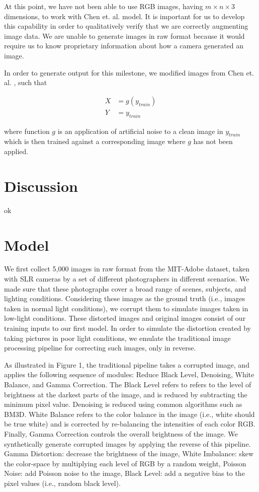 \documentclass{article}
\begin{document}
At this point, we have not been able to use RGB images, having
$m \times n \times 3$ dimensions, to work with Chen et. al.
\cite{chen2018learning} model. It is important for us to develop this
capability in order to qualitatively verify that we are correctly augmenting
image data. We are unable to generate images in raw format because
it would require us to know proprietary information about how a camera
generated an image.

In order to generate output for this milestone, we modified images from
Chen et. al. \cite{chen2018learning}, such that

\begin{align*}
  X &= g(y_{train})\\
  Y &= y_{train}
\end{align*}

where function $g$ is an application of artificial noise to a clean
image in $y_{train}$ which is then trained against a corresponding
image where $g$ has not been applied.


\section{Discussion}

ok


\section{Model}

We first collect 5,000 images in raw format from the MIT-Adobe dataset, taken with SLR cameras by a set of different photographers in different scenarios. We made sure that these photographs cover a broad range of scenes, subjects, and lighting conditions. Considering these images as the ground truth (i.e., images taken in normal light conditions), we corrupt them to simulate images taken in low-light conditions. These distorted images and original images consist of our training inputs to our first model. 
In order to simulate the distortion created by taking pictures in poor light conditions, we emulate the traditional image processing pipeline for correcting such images, only in reverse. 

As illustrated in Figure 1, the traditional pipeline takes a corrupted image, and applies the following sequence of modules: Reduce Black Level, Denoising, White Balance, and Gamma Correction. The Black Level refers to refers to the level of brightness at the darkest parts of the image, and is reduced by subtracting the minimum pixel value. Denoising is reduced using common algorithms such as BM3D. White Balance refers to the color balance in the image (i.e., white should be true white) and is corrected by re-balancing the intensities of each color RGB. Finally, Gamma Correction controls the overall brightness of the image. We synthetically generate corrupted images by applying the reverse of this pipeline. Gamma Distortion: decrease the brightness of the image, White Imbalance: skew the color-space by multiplying each level of RGB by a random weight, Poisson Noise: add Poisson noise to the image, Black Level: add a negative bias to the pixel values (i.e., random black level). 
\end{document}
